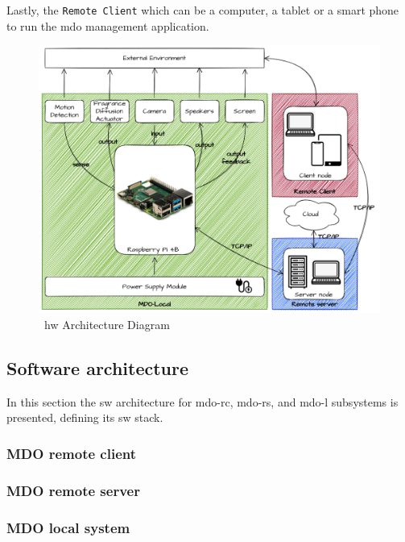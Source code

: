 Lastly, the \texttt{Remote Client} which can be a computer, a tablet or a smart phone to run the \gls{mdo} management application.
%
\begin{figure}
\centering
    \includegraphics[width=0.9\columnwidth]{./img/HW_Architecture.png}
  \caption{~\gls{hw} Architecture Diagram}%
\label{fig:hw-arch}
\end{figure}
%
%
\subsection{Software architecture}
\label{sec:softw-arch}
In this section the \gls{sw} architecture for \gls{mdo-rc}, \gls{mdo-rs}, and
\gls{mdo-l} subsystems is presented, defining its \gls{sw} stack.

\subsubsection{MDO remote client}
\label{sec:mdo-remote-client}

\subsubsection{MDO remote server}
\label{sec:mdo-remote-server-1}

\subsubsection{MDO local system}
\label{sec:mdo-local-system-1}




